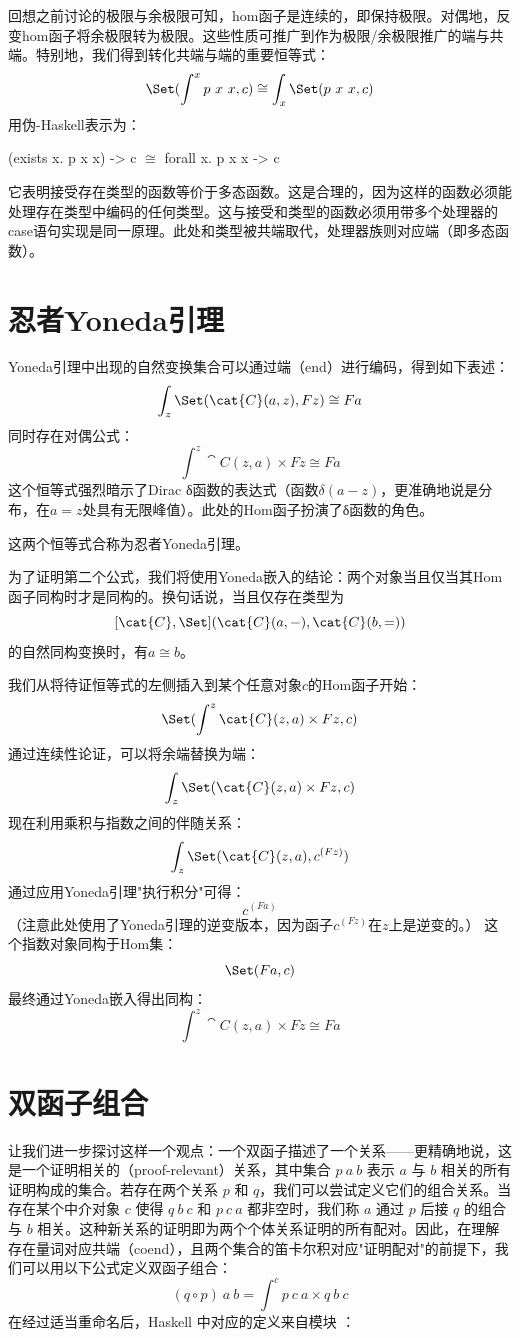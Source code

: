 回想之前讨论的极限与余极限可知，hom函子是连续的，即保持极限。对偶地，反变hom函子将余极限转为极限。这些性质可推广到作为极限/余极限推广的端与共端。特别地，我们得到转化共端与端的重要恒等式：
$$\Set(\int^x p\ x\ x, c) \cong \int_x \Set(p\ x\ x, c)$$
用伪-Haskell表示为：

\begin{snipv}
(exists x. p x x) -> c \ensuremath{\cong} forall x. p x x -> c
\end{snipv}
它表明接受存在类型的函数等价于多态函数。这是合理的，因为这样的函数必须能处理存在类型中编码的任何类型。这与接受和类型的函数必须用带多个处理器的case语句实现是同一原理。此处和类型被共端取代，处理器族则对应端（即多态函数）。

\section{忍者Yoneda引理}

Yoneda引理中出现的自然变换集合可以通过端（end）进行编码，得到如下表述：
\[\int_z \Set(\cat{C}(a, z), F z) \cong F a\]
同时存在对偶公式：
\[\int^z \cat{C}(z, a)\times{}F z \cong F a\]
这个恒等式强烈暗示了Dirac δ函数的表达式（函数$\delta(a - z)$，更准确地说是分布，在$a = z$处具有无限峰值）。此处的Hom函子扮演了δ函数的角色。

这两个恒等式合称为忍者Yoneda引理。

为了证明第二个公式，我们将使用Yoneda嵌入的结论：两个对象当且仅当其Hom函子同构时才是同构的。换句话说，当且仅存在类型为
$$[\cat{C}, \Set](\cat{C}(a, -), \cat{C}(b, =))$$
的自然同构变换时，有$a \cong b$。

我们从将待证恒等式的左侧插入到某个任意对象$c$的Hom函子开始：
$$\Set(\int^z \cat{C}(z, a)\times{}F z, c)$$
通过连续性论证，可以将余端替换为端：
$$\int_z \Set(\cat{C}(z, a)\times{}F z, c)$$
现在利用乘积与指数之间的伴随关系：
$$\int_z \Set(\cat{C}(z, a), c^{(F z)})$$
通过应用Yoneda引理"执行积分"可得：
$$c^{(F a)}$$
（注意此处使用了Yoneda引理的逆变版本，因为函子$c^{(F z)}$在$z$上是逆变的。）
这个指数对象同构于Hom集：
$$\Set(F a, c)$$
最终通过Yoneda嵌入得出同构：
$$\int^z \cat{C}(z, a)\times{}F z \cong F a$$

\section{双函子组合}

让我们进一步探讨这样一个观点：一个双函子描述了一个关系——更精确地说，这是一个证明相关的（proof-relevant）关系，其中集合 $p\ a\ b$ 表示 $a$ 与 $b$ 相关的所有证明构成的集合。若存在两个关系 $p$ 和 $q$，我们可以尝试定义它们的组合关系。当存在某个中介对象 $c$ 使得 $q\ b\ c$ 和 $p\ c\ a$ 都非空时，我们称 $a$ 通过 $p$ 后接 $q$ 的组合与 $b$ 相关。这种新关系的证明即为两个个体关系证明的所有配对。因此，在理解存在量词对应共端（coend），且两个集合的笛卡尔积对应"证明配对"的前提下，我们可以用以下公式定义双函子组合：
\[(q \circ p)\ a\ b = \int^c p\ c\ a\times{}q\ b\ c\]
在经过适当重命名后，Haskell 中对应的定义来自模块 ：

